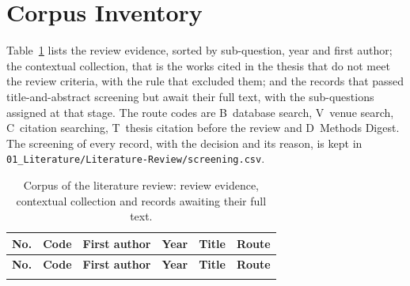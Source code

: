 {\small

}

\section{Corpus Inventory}
\label{app:lit-inventory}
Table~\ref{tab:lit-included} lists the review evidence, sorted by sub-question,
year and first author; the contextual collection, that is the works cited in
the thesis that do not meet the review criteria, with the rule that excluded
them; and the records that passed title-and-abstract screening but await their
full text, with the sub-questions assigned at that stage. The route codes are
B~database search, V~venue search, C~citation searching, T~thesis citation
before the review and D~Methods Digest. The screening of every
record, with the decision and its reason, is kept in
\texttt{01\_Literature/Literature-Review/screening.csv}.

{\footnotesize
\setlength{\tabcolsep}{3.5pt}
\begin{longtable}{@{}r l >{\raggedright\arraybackslash}p{2.2cm} r >{\raggedright\arraybackslash}p{5.9cm} l@{}}
\caption{Corpus of the literature review: review evidence, contextual collection and records awaiting their full text.}\label{tab:lit-included}\\
\toprule
\textbf{No.} & \textbf{Code} & \textbf{First author} & \textbf{Year} & \textbf{Title} & \textbf{Route} \\
\midrule
\endfirsthead
\toprule
\textbf{No.} & \textbf{Code} & \textbf{First author} & \textbf{Year} & \textbf{Title} & \textbf{Route} \\
\midrule
\endhead
\bottomrule
\endfoot
\multicolumn{6}{@{}l}{\textbf{Review evidence (full text assessed)}} \\

\end{longtable}
}

